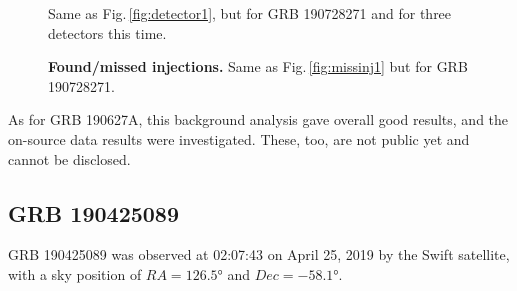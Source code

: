 \documentclass[binding=0.6cm, LaM]{sapthesis}
\begin{document}
\begin{figure}[!t]
          \centering
          \caption{Same as Fig.\,\ref{fig:detector1}, but for GRB 190728271 and for three detectors this time.}
          \label{fig:detector2_final}
        \end{figure}
        \begin{figure}[!t]
          \noindent
          \label{missinj2_3}
          \centering
          \caption{\textbf{Found/missed injections.} Same as Fig.\,\ref{fig:missinj1} but for GRB 190728271.}
          \label{fig:missinj2_3}
        \end{figure}
        As for GRB 190627A, this background analysis gave overall good results,
	and the on-source data results were investigated.
	These, too, are not public yet and cannot be disclosed.

\subsection{GRB 190425089}
        GRB 190425089 was observed at 02:07:43 on April 25, 2019 by the Swift satellite,
        with a sky position of $RA=\ang{126.5}$ and $Dec=\ang{-58.1}$.
\end{document}
